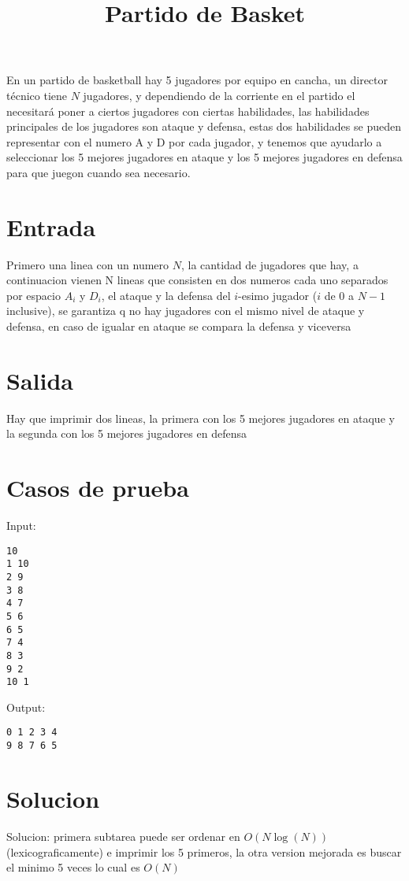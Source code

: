 \documentclass{article}
\title{Partido de Basket}
\begin{document}
\maketitle

En un partido de basketball hay 5 jugadores por equipo en cancha, un director técnico tiene $N$ jugadores, y dependiendo de la corriente en el partido
el necesitará poner a ciertos jugadores con ciertas habilidades, las habilidades principales de los jugadores son ataque y defensa, estas dos habilidades
se pueden representar con el numero A y D por cada jugador, y tenemos que ayudarlo a seleccionar los 5 mejores jugadores en ataque y los 5 mejores jugadores
en defensa para que juegon cuando sea necesario.

\section*{Entrada}

Primero una linea con un numero $N$, la cantidad de jugadores que hay, a continuacion vienen N lineas que consisten en dos numeros cada uno separados por espacio
$A_i$ y $D_i$, el ataque y la defensa del $i$-esimo jugador ($i$ de 0 a $N-1$ inclusive), se garantiza q no hay jugadores con el mismo nivel de ataque y defensa, en caso de
igualar en ataque se compara la defensa y viceversa

\section*{Salida}

Hay que imprimir dos lineas, la primera con los 5 mejores jugadores en ataque y la segunda con los 5 mejores jugadores en defensa

\section*{Casos de prueba}

Input:

\begin{verbatim}
10
1 10
2 9
3 8
4 7
5 6
6 5
7 4
8 3
9 2
10 1
\end{verbatim}

Output:

\begin{verbatim}
0 1 2 3 4
9 8 7 6 5
\end{verbatim}

\section*{Solucion}
Solucion: primera subtarea puede ser ordenar en $O(N\log(N))$ (lexicograficamente) e imprimir los 5 primeros, la otra version mejorada es buscar el minimo 5 veces lo cual es $O(N)$
\end{document}
